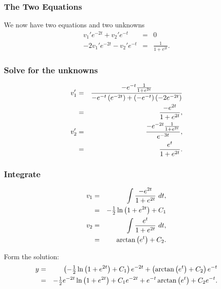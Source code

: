 \begin{frame}
  \frametitle{The Two Equations}

  We now have two equations and two unknowns
  \begin{eqnarray*}
    v_1'e^{-2t} + v_2' e^{-t}& = & 0 \\
    -2 v_1' e^{-2t}  - v_2' e^{-t} & = & \frac{1}{1+e^{2t}}. 
  \end{eqnarray*}

\end{frame}

\begin{frame}
  \frametitle{Solve for the unknowns}
  \begin{eqnarray*}
    v_1' & = & \frac{-e^{-t} \frac{1}{1+e^{2t}}}{
      -e^{-t}\left( e^{-2t} \right) + \left( - e^{-t}\right) \left( -2 e^{-2t} \right)} \\
    & = & \frac{-e^{2t}}{1+e^{2t}}, \\
    v_2' & = & \frac{-e^{-2t}\frac{1}{1+e^{2t}}}{e^{-3t}}, \\
    & = & \frac{e^t}{1+e^{2t}}.
  \end{eqnarray*}
\end{frame}

\begin{frame}
  \frametitle{Integrate}
  
  \begin{eqnarray*}
    v_1 & = & \int \frac{-e^{2t}}{1+e^{2t}} ~ dt, \\
    & = & -\mbox{$\frac{1}{2}$} \ln\left( 1 + e^{2t} \right) + C_1 \\
    v_2 & = & \int \frac{e^t}{1+e^{2t}} ~ dt, \\
    & = & \arctan\left( e^t \right) + C_2.
  \end{eqnarray*}

  Form the solution:
  \begin{eqnarray*}
    y & = & \left( -\mbox{$\frac{1}{2}$} \ln\left( 1 + e^{2t} \right) + C_1 \right) e^{-2t} + \left( \arctan\left( e^t \right) + C_2 \right) e^{-t} \\
    & = & -\mbox{$\frac{1}{2}$} e^{-2t} \ln \left( 1 + e^{2t} \right) + C_1 e^{-2t} + e^{-t} \arctan\left( e^t \right) + C_2 e^{-t}.
  \end{eqnarray*}

\end{frame}


